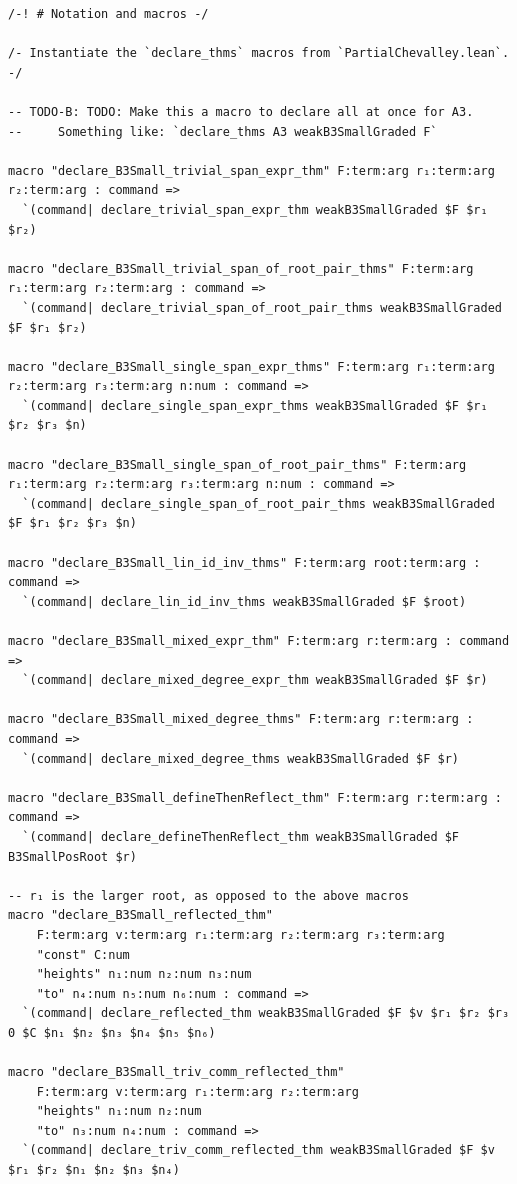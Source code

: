 \begin{Verbatim}
/-! # Notation and macros -/

/- Instantiate the `declare_thms` macros from `PartialChevalley.lean`. -/

-- TODO-B: TODO: Make this a macro to declare all at once for A3.
--     Something like: `declare_thms A3 weakB3SmallGraded F`

macro "declare_B3Small_trivial_span_expr_thm" F:term:arg r₁:term:arg r₂:term:arg : command =>
  `(command| declare_trivial_span_expr_thm weakB3SmallGraded $F $r₁ $r₂)

macro "declare_B3Small_trivial_span_of_root_pair_thms" F:term:arg r₁:term:arg r₂:term:arg : command =>
  `(command| declare_trivial_span_of_root_pair_thms weakB3SmallGraded $F $r₁ $r₂)

macro "declare_B3Small_single_span_expr_thms" F:term:arg r₁:term:arg r₂:term:arg r₃:term:arg n:num : command =>
  `(command| declare_single_span_expr_thms weakB3SmallGraded $F $r₁ $r₂ $r₃ $n)

macro "declare_B3Small_single_span_of_root_pair_thms" F:term:arg r₁:term:arg r₂:term:arg r₃:term:arg n:num : command =>
  `(command| declare_single_span_of_root_pair_thms weakB3SmallGraded $F $r₁ $r₂ $r₃ $n)

macro "declare_B3Small_lin_id_inv_thms" F:term:arg root:term:arg : command =>
  `(command| declare_lin_id_inv_thms weakB3SmallGraded $F $root)

macro "declare_B3Small_mixed_expr_thm" F:term:arg r:term:arg : command =>
  `(command| declare_mixed_degree_expr_thm weakB3SmallGraded $F $r)

macro "declare_B3Small_mixed_degree_thms" F:term:arg r:term:arg : command =>
  `(command| declare_mixed_degree_thms weakB3SmallGraded $F $r)

macro "declare_B3Small_defineThenReflect_thm" F:term:arg r:term:arg : command =>
  `(command| declare_defineThenReflect_thm weakB3SmallGraded $F B3SmallPosRoot $r)

-- r₁ is the larger root, as opposed to the above macros
macro "declare_B3Small_reflected_thm"
    F:term:arg v:term:arg r₁:term:arg r₂:term:arg r₃:term:arg
    "const" C:num
    "heights" n₁:num n₂:num n₃:num
    "to" n₄:num n₅:num n₆:num : command =>
  `(command| declare_reflected_thm weakB3SmallGraded $F $v $r₁ $r₂ $r₃ 0 $C $n₁ $n₂ $n₃ $n₄ $n₅ $n₆)

macro "declare_B3Small_triv_comm_reflected_thm"
    F:term:arg v:term:arg r₁:term:arg r₂:term:arg
    "heights" n₁:num n₂:num
    "to" n₃:num n₄:num : command =>
  `(command| declare_triv_comm_reflected_thm weakB3SmallGraded $F $v $r₁ $r₂ $n₁ $n₂ $n₃ $n₄)


\end{Verbatim}
